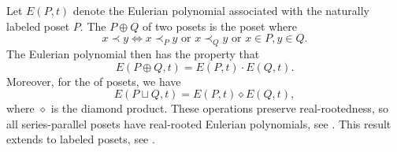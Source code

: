 \begin{example*}
Let $E(P,t)$ denote the Eulerian polynomial associated with the naturally labeled poset $P$.
The  $P \oplus Q$ of two posets is the poset
where
\[
x \prec y \iff x \prec_P y \text{ or } x \prec_Q y \text{ or } x \in P, y \in Q.
\]
The Eulerian polynomial then has the property that
\[
E(P \oplus Q, t) = E(P,t) \cdot E(Q,t).
\]
Moreover, for the  of posets, we have
\[
E(P \sqcup Q, t) = E(P,t) \diamond E(Q,t),
\]
where $\diamond$ is the diamond product.
These operations preserve real-rootedness, so all series-parallel posets have real-rooted Eulerian polynomials,
see \cite{Wagner1992,Wagner1992en}.
This result extends to labeled posets, see \cite{Branden2004operators}.
\end{example*}
